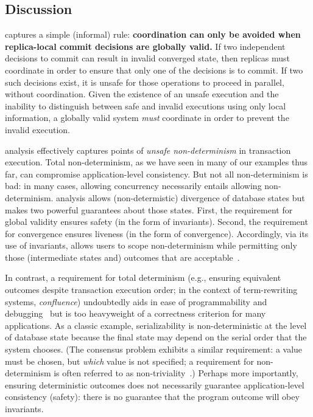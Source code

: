 \subsection{Discussion}

\iconfluence captures a simple (informal) rule: \textbf{coordination
  can only be avoided when replica-local commit decisions are globally
  valid.} If two independent decisions to commit can result in invalid
converged state, then replicas must coordinate in order to ensure that
only one of the decisions is to commit. If two such decisions exist,
it is unsafe for those operations to proceed in parallel, without
coordination. Given the existence of an unsafe execution and the
inability to distinguish between safe and invalid executions using
only local information, a globally valid system \textit{must}
coordinate in order to prevent the invalid execution.

\iconfluence analysis effectively captures points of \textit{unsafe
  non-determinism} in transaction execution. Total non-determinism, as
we have seen in many of our examples thus far, can compromise
application-level consistency. But not all non-determinism is bad: in
many cases, allowing concurrency necessarily entails allowing
non-determinism. \iconfluence analysis allows (non-determistic)
divergence of database states but makes two powerful guarantees about
those states. First, the requirement for global validity ensures
safety (in the form of invariants). Second, the requirement for
convergence ensures liveness (in the form of
convergence). Accordingly, via its use of invariants, \iconfluence
allows users to scope non-determinism while permitting only those
(intermediate states and) outcomes that are
acceptable~\cite{consistency-borders}.

In contrast, a requirement for total determinism (e.g., ensuring
equivalent outcomes despite transaction execution order; in the
context of term-rewriting systems, \textit{confluence}) undoubtedly
aids in ease of programmability and
debugging~\cite{blooml,calm,termrewriting} but is too heavyweight of a
correctness criterion for many applications. As a classic example,
serializability is non-deterministic at the level of database state
because the final state may depend on the serial order that the system
chooses. (The consensus problem exhibits a similar requirement: a
value must be chosen, but \textit{which} value is not specified; a
requirement for non-determinism is often referred to as
non-triviality~\cite{paxos-commit}.) Perhaps more importantly, ensuring
deterministic outcomes does not necessarily guarantee
application-level consistency (safety): there is no guarantee that the
program outcome will obey invariants.

